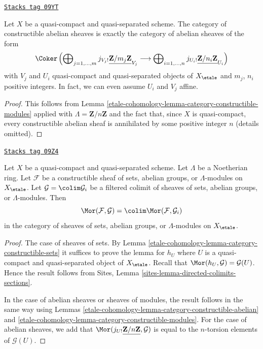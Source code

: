 \begin{lemma}
\label{etale-cohomology-lemma-category-constructible-abelian}
\href{https://stacks.math.columbia.edu/tag/09YT}{\texttt{Stacks tag 09YT}}

Let $X$ be a quasi-compact and quasi-separated scheme. The category of
constructible abelian sheaves is exactly the category of abelian
sheaves of the form
$$
\Coker\left(
\bigoplus\nolimits_{j = 1, \ldots, m}
j_{V_j!}\underline{\mathbf{Z}/m_j\mathbf{Z}}_{V_j}
\longrightarrow
\bigoplus\nolimits_{i = 1, \ldots, n}
j_{U_i!}\underline{\mathbf{Z}/n_i\mathbf{Z}}_{U_i}
\right)
$$
with $V_j$ and $U_i$ quasi-compact and quasi-separated objects of
$X_\etale$ and $m_j$, $n_i$ positive integers.
In fact, we can even assume $U_i$ and $V_j$ affine.
\end{lemma}

\begin{proof}
This follows from Lemma \ref{etale-cohomology-lemma-category-constructible-modules}
applied with $\Lambda = \mathbf{Z}/n\mathbf{Z}$
and the fact that, since $X$ is quasi-compact, every constructible
abelian sheaf is annihilated by some positive integer $n$ (details omitted).
\end{proof}

\begin{lemma}
\label{etale-cohomology-lemma-constructible-is-compact}
\href{https://stacks.math.columbia.edu/tag/09Z4}{\texttt{Stacks tag 09Z4}}

Let $X$ be a quasi-compact and quasi-separated scheme. Let $\Lambda$ be a
Noetherian ring. Let $\mathcal{F}$ be a constructible sheaf of sets, abelian
groups, or $\Lambda$-modules on $X_\etale$. Let
$\mathcal{G} = \colim \mathcal{G}_i$ be a filtered colimit of sheaves of
sets, abelian groups, or $\Lambda$-modules. Then
$$
\Mor(\mathcal{F}, \mathcal{G}) = \colim \Mor(\mathcal{F}, \mathcal{G}_i)
$$
in the category of sheaves of sets, abelian groups, or $\Lambda$-modules on
$X_\etale$.
\end{lemma}

\begin{proof}
The case of sheaves of sets. By Lemma \ref{etale-cohomology-lemma-category-constructible-sets}
it suffices to prove the lemma for $h_U$ where $U$ is a quasi-compact
and quasi-separated object of $X_\etale$. Recall that
$\Mor(h_U, \mathcal{G}) = \mathcal{G}(U)$. Hence the result
follows from Sites, Lemma \ref{sites-lemma-directed-colimits-sections}.

\medskip\noindent
In the case of abelian sheaves or sheaves of modules, the result follows
in the same way using
Lemmas \ref{etale-cohomology-lemma-category-constructible-abelian} and
\ref{etale-cohomology-lemma-category-constructible-modules}.
For the case of abelian sheaves, we add that
$\Mor(j_{U!}\underline{\mathbf{Z}/n\mathbf{Z}}, \mathcal{G})$
is equal to the $n$-torsion elements of $\mathcal{G}(U)$.
\end{proof}

